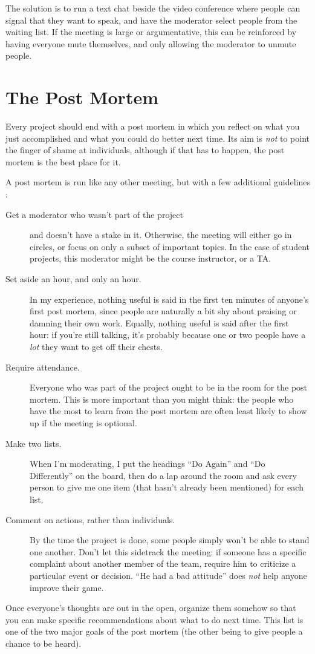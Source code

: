 The solution is to run a text chat beside the video conference where
people can signal that they want to speak, and have the moderator
select people from the waiting list.  If the meeting is large or
argumentative, this can be reinforced by having everyone mute
themselves, and only allowing the moderator to unmute people.

\section*{The Post Mortem}

Every project should end with a post mortem in which you reflect on
what you just accomplished and what you could do better next time.  Its
aim is \emph{not} to point the finger of shame at individuals,
although if that has to happen, the post mortem is the best place for
it.

A post mortem is run like any other meeting, but with a few additional
guidelines \cite{Derb2006}:

\begin{description}

\item[Get a moderator who wasn't part of the project] and doesn't have
  a stake in it.  Otherwise, the meeting will either go in circles, or
  focus on only a subset of important topics.  In the case of student
  projects, this moderator might be the course instructor, or a TA.

\item[Set aside an hour, and only an hour.] In my experience, nothing
  useful is said in the first ten minutes of anyone's first post
  mortem, since people are naturally a bit shy about praising or
  damning their own work.  Equally, nothing useful is said after the
  first hour: if you're still talking, it's probably because one or
  two people have a \emph{lot} they want to get off their chests.

\item[Require attendance.] Everyone who was part of the project ought
  to be in the room for the post mortem.  This is more important than
  you might think: the people who have the most to learn from the post
  mortem are often least likely to show up if the meeting is optional.

\item[Make two lists.] When I'm moderating, I put the headings ``Do
  Again'' and ``Do Differently'' on the board, then do a lap around
  the room and ask every person to give me one item (that hasn't
  already been mentioned) for each list.

\item[Comment on actions, rather than individuals.] By the time the
  project is done, some people simply won't be able to stand one
  another.  Don't let this sidetrack the meeting: if someone has a
  specific complaint about another member of the team, require him to
  criticize a particular event or decision.  ``He had a bad attitude''
  does \emph{not} help anyone improve their game.

\end{description}

Once everyone's thoughts are out in the open, organize them somehow so
that you can make specific recommendations about what to do next time.
This list is one of the two major goals of the post mortem (the other
being to give people a chance to be heard).
